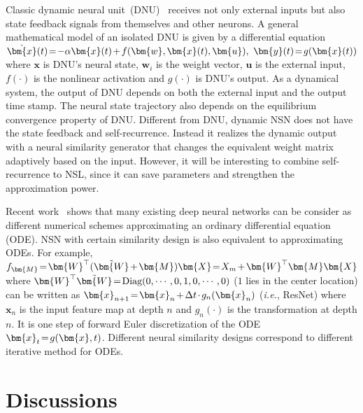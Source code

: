 Classic dynamic neural unit~(DNU)~\cite{gupta2004static} receives not only external inputs but also state feedback signals from themselves and other neurons. A general mathematical model of an isolated DNU is given by a differential equation $\thickmuskip=2mu \medmuskip=2mu \dot{\bm{x}}(t)=-\alpha \bm{x}(t)+f(\bm{w},\bm{x}(t),\bm{u}),\ \bm{y}(t)=g(\bm{x}(t))$ where $\bm{x}$ is DNU's neural state, $\bm{w}_i$ is the weight vector, $\bm{u}$ is the external input, $f(\cdot)$ is the nonlinear activation and $g(\cdot)$ is DNU's output. As a dynamical system, the output of DNU depends on both the external input and the output time stamp. The neural state trajectory also depends on the equilibrium convergence property of DNU. Different from DNU, dynamic NSN does not have the state feedback and self-recurrence. Instead it realizes the dynamic output with a neural similarity generator that changes the equivalent weight matrix adaptively based on the input. However, it will be interesting to combine self-recurrence to NSL, since it can save parameters and strengthen the approximation power.
\par
Recent work~\cite{chen2018neural,lu2017beyond,ruthotto2018deep,weinan2017proposal} shows that many existing deep neural networks can be consider as different numerical schemes approximating an ordinary differential equation (ODE). NSN with certain similarity design is also equivalent to approximating ODEs. For example, $\thickmuskip=2mu \medmuskip=2mu f_{\bm{M}} = \bm{W}^\top(\tilde{\bm{W}}+\bm{M}) \bm{X}=X_m+\bm{W}^\top\bm{M}\bm{X}$ where $\thickmuskip=2mu \medmuskip=2mu \bm{W}^\top\tilde{\bm{W}}=\textnormal{Diag}(0,\cdots,0,1,0,\cdots,0)$ ($1$ lies in the center location) can be written as $\thickmuskip=2mu \medmuskip=2mu \bm{x}_{n+1}=\bm{x}_n+\Delta t \cdot g_n(\bm{x}_n)$ (\emph{i.e.}, ResNet) where $\bm{x}_n$ is the input feature map at depth $n$ and $g_n(\cdot)$ is the transformation at depth $n$. It is one step of forward Euler discretization of the ODE $\thickmuskip=2mu \medmuskip=2mu \bm{x}_t=g(\bm{x},t)$. Different neural similarity designs correspond to different iterative method for ODEs. 

\section{Discussions}

